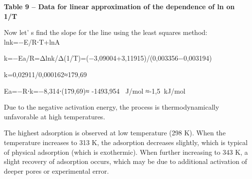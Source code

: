 {\bfseries Table 9 -- Data for linear approximation of the dependence of ln
on 1/T}


Now let' s find the slope for the line using the least
squares method:
lnk=−E/R\hspace{0pt}\hspace{0pt}⋅T\hspace{0pt}+lnA

k=−Ea/R=Δlnk/Δ(1/T)=(−3,09004+3,11915)/(0,003356−0,003194)

k=0,02911/0,000162≈179,69

Ea=−R⋅k=−8,314⋅(179,69)≈ -1493,954   J/mol ≈-1,5 
kJ/mol

Due to the negative activation energy, the process is thermodynamically
unfavorable at high temperatures.

The highest adsorption is observed at low temperature (298 K). When the
temperature increases to 313 K, the adsorption decreases slightly, which
is typical of physical adsorption (which is exothermic). When further
increasing to 343 K, a slight recovery of adsorption occurs, which may
be due to additional activation of deeper pores or experimental error.

